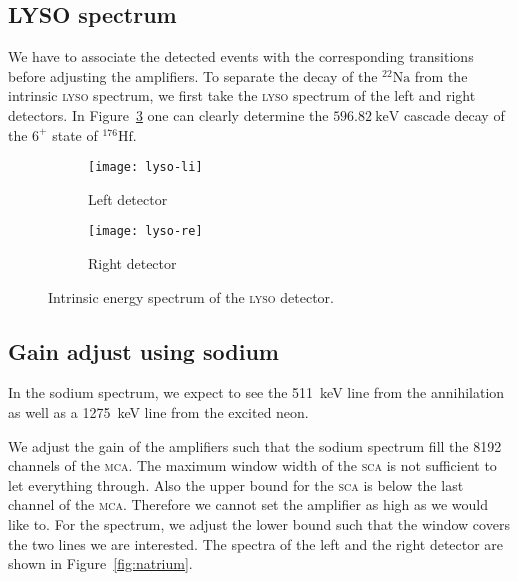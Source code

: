 \documentclass[11pt, english, fleqn, DIV=15, headinclude, BCOR=2cm]{scrreprt}
\begin{document}
\subsection{LYSO spectrum}

We have to associate the detected events with the corresponding transitions
before adjusting the amplifiers. To separate the decay of the
${}^{22}\text{Na}$ from the intrinsic \textsc{lyso} spectrum, we first take the
\textsc{lyso} spectrum of the left and right detectors. In
Figure~\ref{fig:lyso} one can clearly determine the
$\SI{596.82}{\kilo\electronvolt}$ cascade decay of the $6^+$ state of
${}^{176}\text{Hf}$.

\begin{figure}
        \centering
        \begin{subfigure}[c]{.49\linewidth}
                \centering
                \texttt{[image: lyso-li]}
                \caption{%
                        Left detector
                }
                \label{fig:lyso-li}
        \end{subfigure}
        \hfill
        \begin{subfigure}[c]{.49\linewidth}
                \centering
                \texttt{[image: lyso-re]}
                \caption{%
                        Right detector
                }
                \label{fig:lyso-re}
        \end{subfigure}
        \caption{%
                Intrinsic energy spectrum of the \textsc{lyso} detector.
        }
        \label{fig:lyso}
\end{figure}

\subsection{Gain adjust using sodium}

In the sodium spectrum, we expect to see the \SI{511}{\kilo\electronvolt} line
from the annihilation as well as a \SI{1275}{\kilo\electronvolt} line from the
excited neon.

We adjust the gain of the amplifiers such that the sodium spectrum fill the
8192 channels of the \textsc{mca}. The maximum window width of the \textsc{sca}
is not sufficient to let everything through. Also the upper bound for the
\textsc{sca} is below the last channel of the \textsc{mca}. Therefore we cannot
set the amplifier as high as we would like to. For the spectrum, we adjust the
lower bound such that the window covers the two lines we are interested. The
spectra of the left and the right detector are shown in
Figure~\ref{fig:natrium}.
\end{document}

